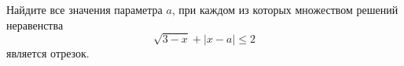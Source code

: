 \begin{ex}
	\begin{condition}
		Найдите все значения параметра \( a \), при каждом из которых множеством решений неравенства \[ \sqrt{3-x}+|x-a|\le2 \] является отрезок.
	\end{condition}
	\answer{\( (-1;1)\cup\left[ \dfrac{5}{4};5 \right) \)}
\end{ex}